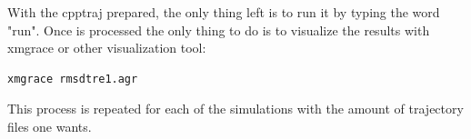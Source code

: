 \documentclass[a4paper]{article}
\begin{document}
With the cpptraj prepared, the only thing left is to run it by typing the word "run". Once is processed the only thing to do is to visualize the results with xmgrace or other visualization tool:

\begin{lstlisting}[language=Bash,caption={Visualization}]
    xmgrace rmsdtre1.agr
\end{lstlisting}

This process is repeated for each of the simulations with the amount of trajectory files one wants. 

	
\end{document}
